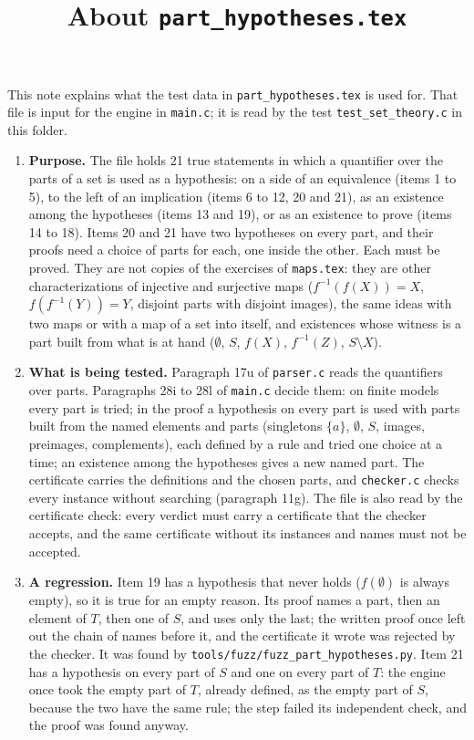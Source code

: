 \documentclass[11pt,a4paper]{article}
\title{About \texttt{part\_hypotheses.tex}}
\author{}
\date{}
\begin{document}
\maketitle
This note explains what the test data in \texttt{part\_hypotheses.tex} is used for. That file is input for the engine in \texttt{main.c}; it is read by the test \texttt{test\_set\_theory.c} in this folder.

\begin{enumerate}
\item \textbf{Purpose.} The file holds 21 true statements in which a quantifier over the parts of a set is used as a hypothesis: on a side of an equivalence (items 1 to 5), to the left of an implication (items 6 to 12, 20 and 21), as an existence among the hypotheses (items 13 and 19), or as an existence to prove (items 14 to 18). Items 20 and 21 have two hypotheses on every part, and their proofs need a choice of parts for each, one inside the other. Each must be proved. They are not copies of the exercises of \texttt{maps.tex}: they are other characterizations of injective and surjective maps ($f^{-1}(f(X)) = X$, $f(f^{-1}(Y)) = Y$, disjoint parts with disjoint images), the same ideas with two maps or with a map of a set into itself, and existences whose witness is a part built from what is at hand ($\emptyset$, $S$, $f(X)$, $f^{-1}(Z)$, $S \setminus X$).

\item \textbf{What is being tested.} Paragraph 17u of \texttt{parser.c} reads the quantifiers over parts. Paragraphs 28i to 28l of \texttt{main.c} decide them: on finite models every part is tried; in the proof a hypothesis on every part is used with parts built from the named elements and parts (singletons $\{a\}$, $\emptyset$, $S$, images, preimages, complements), each defined by a rule and tried one choice at a time; an existence among the hypotheses gives a new named part. The certificate carries the definitions and the chosen parts, and \texttt{checker.c} checks every instance without searching (paragraph 11g). The file is also read by the certificate check: every verdict must carry a certificate that the checker accepts, and the same certificate without its instances and names must not be accepted.

\item \textbf{A regression.} Item 19 has a hypothesis that never holds ($f(\emptyset)$ is always empty), so it is true for an empty reason. Its proof names a part, then an element of $T$, then one of $S$, and uses only the last; the written proof once left out the chain of names before it, and the certificate it wrote was rejected by the checker. It was found by \texttt{tools/fuzz/fuzz\_part\_hypotheses.py}. Item 21 has a hypothesis on every part of $S$ and one on every part of $T$: the engine once took the empty part of $T$, already defined, as the empty part of $S$, because the two have the same rule; the step failed its independent check, and the proof was found anyway.


\end{enumerate}
\end{document}

